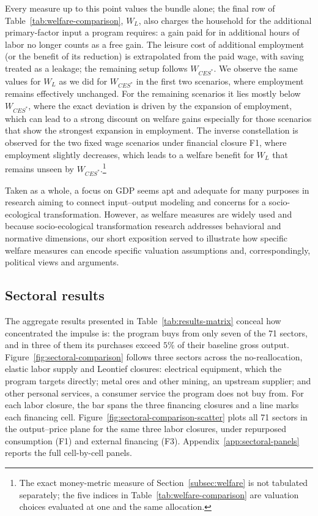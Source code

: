 

Every measure up to this point values the bundle alone; the final row of Table~\ref{tab:welfare-comparison}, $W_L$, also charges the household for the additional primary-factor input a program requires: a gain paid for in additional hours of labor no longer counts as a free gain. The leisure cost of additional employment (or the benefit of its reduction) is extrapolated from the paid wage, with saving treated as a leakage; the remaining setup follows $W_{CES^*}$. We observe the same values for $W_L$ as we did for $W_{CES^*}$ in the first two scenarios, where employment remains effectively unchanged. For the remaining scenarios it lies mostly below $W_{CES^*}$, where the exact deviation is driven by the expansion of employment, which can lead to a strong discount on welfare gains especially for those scenarios that show the strongest expansion in employment. The inverse constellation is observed for the two fixed wage scenarios under financial closure F1, where employment slightly decreases, which leads to a welfare benefit for $W_L$ that remains unseen by $W_{CES^*}$.\footnote{The exact money-metric measure of Section~\ref{subsec:welfare} is not tabulated separately; the five indices in Table~\ref{tab:welfare-comparison} are valuation choices evaluated at one and the same allocation.}

Taken as a whole, a focus on GDP seems apt and adequate for many purposes in research aiming to connect input--output modeling and concerns for a socio-ecological transformation. However, as welfare measures are widely used and because socio-ecological transformation research addresses behavioral and normative dimensions, our short exposition served to illustrate how specific welfare measures can encode specific valuation assumptions and, correspondingly, political views and arguments. 

\subsection{Sectoral results}\label{subsec:sectoral}

The aggregate results presented in Table~\ref{tab:results-matrix} conceal how concentrated the impulse is: the program buys from only seven of the 71 sectors, and in three of them its purchases exceed $5\%$ of their baseline gross output. Figure~\ref{fig:sectoral-comparison} follows three sectors across the no-reallocation, elastic labor supply and Leontief closures: electrical equipment, which the program targets directly; metal ores and other mining, an upstream supplier; and other personal services, a consumer service the program does not buy from. For each labor closure, the bar spans the three financing closures and a line marks each financing cell. Figure~\ref{fig:sectoral-comparison-scatter} plots all 71 sectors in the output--price plane for the same three labor closures, under repurposed consumption (F1) and external financing (F3). Appendix~\ref{app:sectoral-panels} reports the full cell-by-cell panels.

